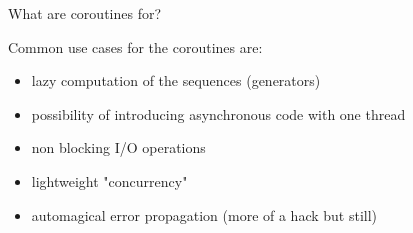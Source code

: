 \documentclass[10pt]{beamer}
\begin{document}
\begin{frame}{What are coroutines for?}
\centerline{Common use cases for the coroutines are:}
      \begin{itemize}[<+- |alert@+>]
        \item lazy computation of the sequences (generators)
        \item possibility of introducing asynchronous code with one thread
        \item non blocking I/O operations
        \item lightweight "concurrency"
        \item automagical error propagation (more of a hack but still)
      \end{itemize}
\end{frame}


\end{document}
